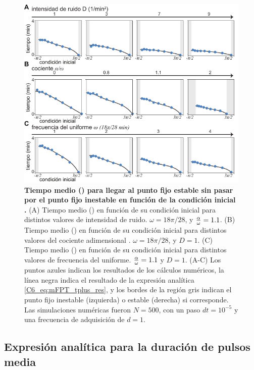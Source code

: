 \documentclass[./main.tex]{subfiles}
\begin{document}
\begin{figure}
    \centering
    \includegraphics[width=1\columnwidth]{figures/chapter6/C6_t_plus.pdf} 
    \caption{\textbf{Tiempo medio \tplus(\xx) para llegar al punto fijo estable \xxe sin pasar por el punto fijo inestable \xxi en función de la condición inicial \xx.} (A) Tiempo medio \tplus(\xx) en función de su condición inicial \xx para distintos valores de intensidad de ruido. $\omega = 18\pi/28$, y $\frac{\alpha}{\omega} = 1.1$. (B) Tiempo medio \tplus(\xx) en función de su condición inicial \xx para distintos valores del cociente adimensional \ddelta. $\omega = 18\pi/28$, y $D = 1$. (C) Tiempo medio \tplus(\xx) en función de su condición inicial \xx para  distintos valores de frecuencia del uniforme. $\frac{\alpha}{\omega} = 1.1$ y $D=1$. (A-C) Los puntos azules indican los resultados de los cálculos numéricos, la línea negra indica el resultado de la expresión analítica \ref{C6_eq:mFPT_tplus_res}, y los bordes de la región gris indican el punto fijo inestable (izquierda) o estable (derecha) si corresponde. Las simulaciones numéricas fueron $N=500$, con un paso $dt = 10^{-5}$ y una frecuencia de adquisición de $d=1$.}
    \label{C6_fig:mFPT_tplus}
\end{figure}

\subsection{Expresión analítica para la duración de pulsos media}
\end{document}

